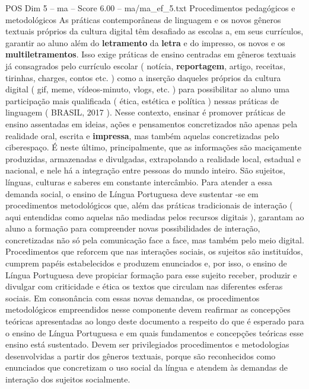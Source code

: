 \begin{textsample}{POS Dim 5 – ma – Score 6.00 – ma/ma\_ef\_5.txt}  \label{ex:f5_pos_172}
Procedimentos pedagógicos e metodológicos As práticas contemporâneas de linguagem e os novos gêneros textuais próprios da cultura digital têm desafiado as escolas a, em seus currículos, garantir ao aluno além do \textbf{letramento} da \textbf{letra} e do impresso, os novos e os \textbf{multiletramentos}.
Isso exige práticas de ensino centradas em gêneros textuais já consagrados pelo currículo escolar ( notícia, \textbf{reportagem}, artigo, receitas, tirinhas, charges, contos etc. ) como a inserção daqueles próprios da cultura digital ( gif, meme, vídeos-minuto, vlogs, etc. ) para possibilitar ao aluno uma participação mais qualificada ( ética, estética e política ) nessas práticas de linguagem ( BRASIL, 2017 ).
Nesse contexto, ensinar é promover práticas de ensino assentadas em ideias, ações e pensamentos concretizados não apenas pela realidade oral, escrita e \textbf{impressa}, mas também aquelas concretizadas pelo ciberespaço.
É neste último, principalmente, que as informações são maciçamente produzidas, armazenadas e divulgadas, extrapolando a realidade local, estadual e nacional, e nele há a integração entre pessoas do mundo inteiro.
São sujeitos, línguas, culturas e saberes em constante intercâmbio.
Para atender a essa demanda social, o ensino de Língua Portuguesa deve sustentar -se em procedimentos metodológicos que, além das práticas tradicionais de interação ( aqui entendidas como aquelas não mediadas pelos recursos digitais ), garantam ao aluno a formação para compreender novas possibilidades de interação, concretizadas não só pela comunicação face a face, mas também pelo meio digital.
Procedimentos que reforcem que nas interações sociais, os sujeitos são instituídos, cumprem papéis estabelecidos e produzem enunciados e, por isso, o ensino de Língua Portuguesa deve propiciar formação para esse sujeito receber, produzir e divulgar com criticidade e ética os textos que circulam nas diferentes esferas sociais.
Em consonância com essas novas demandas, os procedimentos metodológicos empreendidos nesse componente devem reafirmar as concepções teóricas apresentadas ao longo deste documento a respeito do que é esperado para o ensino de Língua Portuguesa e em quais fundamentos e concepções teóricas esse ensino está sustentado.
Devem ser privilegiados procedimentos e metodologias desenvolvidas a partir dos gêneros textuais, porque são reconhecidos como enunciados que concretizam o uso social da língua e atendem às demandas de interação dos sujeitos socialmente.

\end{textsample}
